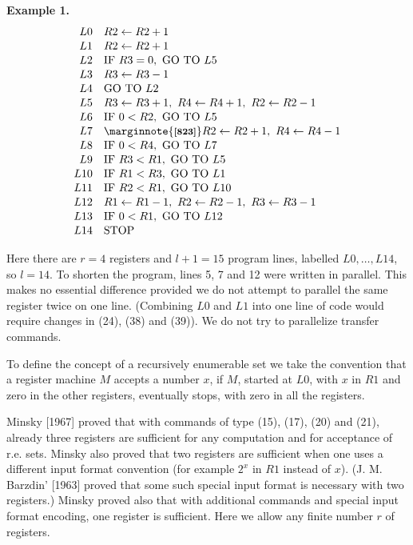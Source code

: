 \documentclass[11pt,leqno]{article}
\newcommand{\origpage}[1]{\marginnote{\footnotesize\textbf{[#1]}}}
\begin{document}
\medskip\noindent\textbf{Example 1.}
\[
\renewcommand{\arraystretch}{1.06}
\begin{array}{@{}r@{\quad}l@{}}
L 0 & R 2\leftarrow R 2+1 \\
L 1 & R 2\leftarrow R 2+1 \\
L 2 & \text{IF }R 3=0,\ \text{GO TO }L 5 \\
L 3 & R 3\leftarrow R 3-1 \\
L 4 & \text{GO TO }L 2 \\
L 5 & R 3\leftarrow R 3+1,\ R 4\leftarrow R 4+1,\ R 2\leftarrow R 2-1 \\
L 6 & \text{IF }0<R 2,\ \text{GO TO }L 5 \\
L 7 & \origpage{823} R 2\leftarrow R 2+1,\ R 4\leftarrow R 4-1 \\
L 8 & \text{IF }0<R 4,\ \text{GO TO }L 7 \\
L 9 & \text{IF }R 3<R 1,\ \text{GO TO }L 5 \\
L 10 & \text{IF }R 1<R 3,\ \text{GO TO }L 1 \\
L 11 & \text{IF }R 2<R 1,\ \text{GO TO }L 10 \\
L 12 & R 1\leftarrow R 1-1,\ R 2\leftarrow R 2-1,\ R 3\leftarrow R 3-1 \\
L 13 & \text{IF }0<R 1,\ \text{GO TO }L 12 \\
L 14 & \text{STOP}
\end{array}
\]

Here there are $r=4$ registers and $l+1=15$ program lines, labelled $L0,\ldots,L14$, so $l=14$. To shorten the program, lines 5, 7 and 12 were written in parallel. This makes no essential difference provided we do not attempt to parallel the same register twice on one line. (Combining $L 0$ and $L 1$ into one line of code would require changes in (24), (38) and (39)). We do not try to parallelize transfer commands.

To define the concept of a recursively enumerable set we take the convention that a register machine $M$ accepts a number $x$, if $M$, started at $L 0$, with $x$ in $R 1$ and zero in the other registers, eventually stops, with zero in all the registers.

Minsky [1967] proved that with commands of type (15), (17), (20) and (21), already three registers are sufficient for any computation and for acceptance of r.e. sets. Minsky also proved that two registers are sufficient when one uses a different input format convention (for example $2^{x}$ in $R 1$ instead of $x$). (J. M. Barzdin' [1963] proved that some such special input format is necessary with two registers.) Minsky proved also that with additional commands and special input format encoding, one register is sufficient. Here we allow any finite number $r$ of registers.
\end{document}
